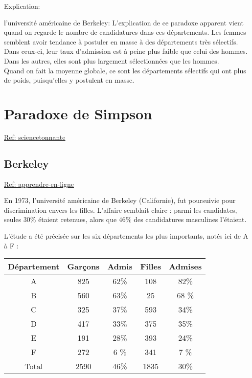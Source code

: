 \documentclass[10pt,dvipsnames, dvips, svgnames]{article}
\begin{document}
Explication:

\begin{list}{}{}
\item l'université américaine de Berkeley:
L'explication de ce paradoxe apparent vient quand on regarde le nombre de candidatures dans ces départements. Les femmes semblent avoir tendance à postuler en masse à des départements très sélectifs. Dans ceux-ci, leur taux d'admission est à peine plus faible que celui des hommes. Dans les autres, elles sont plus largement sélectionnées que les hommes.\\
Quand on fait la moyenne globale, ce sont les départements sélectifs qui ont plus de poids, puisqu'elles y postulent en masse.
\end{list}



\newpage
\section{Paradoxe de Simpson}


\href{https://sciencetonnante.wordpress.com/2013/04/29/le-paradoxe-de-simpson/}{Ref: sciencetonnante}


\subsection{Berkeley}

\href{https://www.apprendre-en-ligne.net/MADIMU2/STATI/STATI1.PDF}{Ref: apprendre-en-ligne}

En 1973, l'université américaine de Berkeley (Californie), fut poursuivie pour discrimination envers les filles. L'affaire semblait claire : parmi les candidates, seules 30\% étaient retenues, alors que 46\% des candidatures masculines l'étaient.


L'étude a été précisée sur les six départements les plus importants, notés ici de A à F : 

\begin{center}
\begin{tabular}[]{|c |c |c |c |c |}
\hline Département & Garçons & Admis & Filles & Admises \\
\hline A & 825 & 62\% & 108 & 82\% \\
\hline B & 560 & 63\% & 25  & 68 \% \\
\hline C & 325 & 37\% & 593 & 34\% \\
\hline D & 417 & 33\% & 375 & 35\% \\
\hline E & 191 & 28\% & 393 & 24\% \\
\hline F & 272 & 6 \% & 341 & 7 \% \\
\hline Total & 2590 & 46\% & 1835 & 30\% \\
\hline  
\end{tabular} 
\end{center}
\end{document}
